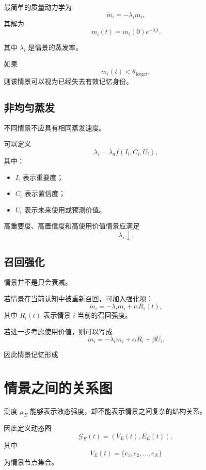 最简单的质量动力学为
\[
\dot m_i
=
-\lambda_i m_i,
\]
其解为
\[
m_i(t)
=
m_i(0)e^{-\lambda_i t}.
\]

其中 $\lambda_i$ 是情景的蒸发率。

如果
\[
m_i(t)<\theta_{\mathrm{forget}},
\]
则该情景可以视为已经失去有效记忆身份。

\subsection{非均匀蒸发}

不同情景不应具有相同蒸发速度。

可以定义
\[
\lambda_i
=
\lambda_0
f
\left(
I_i,
C_i,
U_i
\right),
\]
其中：

\begin{itemize}
    \item $I_i$ 表示重要度；
    \item $C_i$ 表示置信度；
    \item $U_i$ 表示未来使用或预测价值。
\end{itemize}

高重要度、高置信度和高使用价值情景应满足
\[
\lambda_i\downarrow.
\]

\subsection{召回强化}

情景并不是只会衰减。

若情景在当前认知中被重新召回，可加入强化项：
\[
\boxed{
\dot m_i
=
-\lambda_i m_i
+
\alpha R_i(t),
}
\]
其中 $R_i(t)$ 表示情景 $i$ 当前的召回强度。

若进一步考虑使用价值，则可以写成
\[
\dot m_i
=
-\lambda_i m_i
+
\alpha R_i
+
\beta U_i.
\]

因此情景记忆形成
\begin{statementbox}
\centering
{}
\end{statementbox}

\section{情景之间的关系图}

测度 $\mu_E$ 能够表示液态强度，却不能表示情景之间复杂的结构关系。

因此定义动态图
\[
\boxed{
\mathcal{G}_E(t)
=
\left(
V_E(t),
E_E(t)
\right),
}
\]
其中
\[
V_E(t)
=
\{e_1,e_2,\ldots,e_N\}
\]
为情景节点集合。

